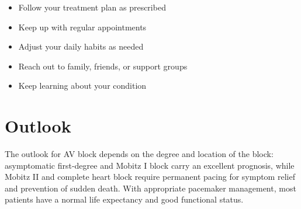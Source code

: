 \begin{itemize}[noitemsep]
  \item Follow your treatment plan as prescribed
  \item Keep up with regular appointments
  \item Adjust your daily habits as needed
  \item Reach out to family, friends, or support groups
  \item Keep learning about your condition
\end{itemize}

\section{Outlook}
The outlook for AV block depends on the degree and location of the block: asymptomatic first-degree and Mobitz I block carry an excellent prognosis, while Mobitz II and complete heart block require permanent pacing for symptom relief and prevention of sudden death. With appropriate pacemaker management, most patients have a normal life expectancy and good functional status.
